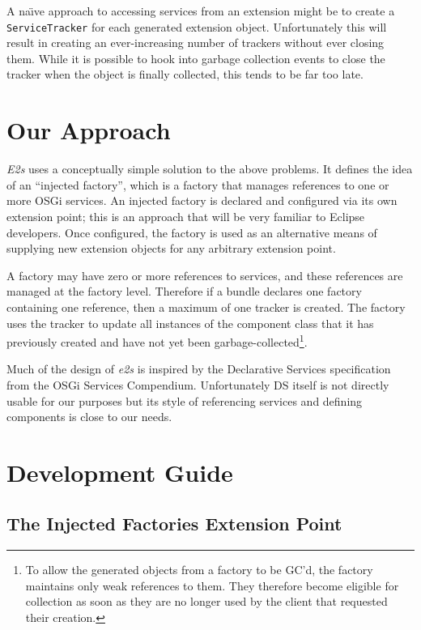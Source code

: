 \documentclass[12pt]{article}
\begin{document}
A na\"\i{}ve approach to accessing services from an extension might be to create a \texttt{ServiceTracker} for each generated extension object. Unfortunately this will result in creating an ever-increasing number of trackers without ever closing them. While it is possible to hook into garbage collection events to close the tracker when the object is finally collected, this tends to be far too late.

\section{Our Approach}

\emph{E2s} uses a conceptually simple solution to the above problems. It defines the idea of an ``injected factory'', which is a factory that manages references to one or more OSGi services. An injected factory is declared and configured via its own extension point; this is an approach that will be very familiar to Eclipse developers. Once configured, the factory is used as an alternative means of supplying new extension objects for any arbitrary extension point.

A factory may have zero or more references to services, and these references are managed at the factory level. Therefore if a bundle declares one factory containing one reference, then a maximum of one tracker is created. The factory uses the tracker to update all instances of the component class that it has previously created and have not yet been garbage-collected\footnote{To allow the generated objects from a factory to be GC'd, the factory maintains only weak references to them. They therefore become eligible for collection as soon as they are no longer used by the client that requested their creation.}.

Much of the design of \emph{e2s} is inspired by the Declarative Services specification from the OSGi Services Compendium. Unfortunately DS itself is not directly usable for our purposes but its style of referencing services and defining components is close to our needs.

\section{Development Guide}

\subsection{The Injected Factories Extension Point}
\end{document}
